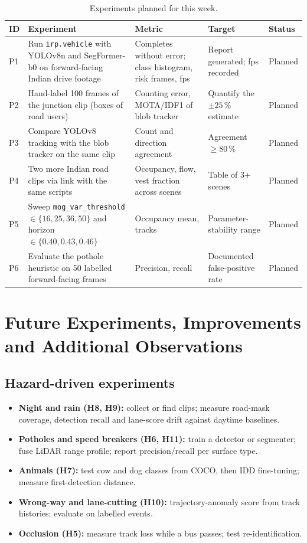 \documentclass[11pt,a4paper]{article}
\begin{document}
\begin{table}[H]
\centering
\small
\caption{Experiments planned for this week.}
\begin{tabular}{@{}l p{4.6cm} p{3.4cm} p{3.4cm} l@{}}
\toprule
ID & Experiment & Metric & Target & Status \\
\midrule
P1 & Run \texttt{irp.vehicle} with YOLOv8n and SegFormer-b0 on forward-facing Indian drive footage & Completes without error; class histogram, risk frames, fps & Report generated; fps recorded & Planned \\
P2 & Hand-label 100 frames of the junction clip (boxes of road users) & Counting error, MOTA/IDF1 of blob tracker & Quantify the $\pm25\,\%$ estimate & Planned \\
P3 & Compare YOLOv8 tracking with the blob tracker on the same clip & Count and direction agreement & Agreement $\ge 80\,\%$ & Planned \\
P4 & Two more Indian road clips via link with the same scripts & Occupancy, flow, vest fraction across scenes & Table of 3+ scenes & Planned \\
P5 & Sweep \texttt{mog\_var\_threshold} $\in\{16,25,36,50\}$ and horizon $\in\{0.40,0.43,0.46\}$ & Occupancy mean, tracks & Parameter-stability range & Planned \\
P6 & Evaluate the pothole heuristic on 50 labelled forward-facing frames & Precision, recall & Documented false-positive rate & Planned \\
\bottomrule
\end{tabular}
\end{table}

\section{Future Experiments, Improvements and Additional Observations}
\subsection{Hazard-driven experiments}
\begin{itemize}
\item \textbf{Night and rain (H8, H9):} collect or find clips; measure road-mask coverage, detection recall and lane-score drift against daytime baselines.
\item \textbf{Potholes and speed breakers (H6, H11):} train a detector or segmenter; fuse LiDAR range profile; report precision/recall per surface type.
\item \textbf{Animals (H7):} test cow and dog classes from COCO, then IDD fine-tuning; measure first-detection distance.
\item \textbf{Wrong-way and lane-cutting (H10):} trajectory-anomaly score from track histories; evaluate on labelled events.
\item \textbf{Occlusion (H5):} measure track loss while a bus passes; test re-identification.
\end{itemize}
\end{document}
